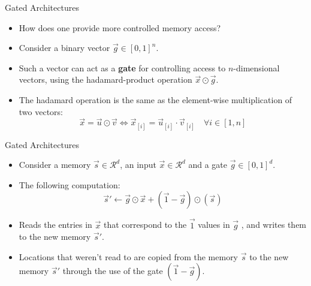 \documentclass[handout]{beamer}
\begin{document}
\begin{frame}{Gated Architectures}
\begin{scriptsize}
\begin{itemize}
\item How does one provide more controlled memory access?
\item Consider a binary vector $\vec{g} \in [0,1]^n$. 
\item Such a vector can act as a \textbf{gate} for controlling access to $n$-dimensional vectors, using the hadamard-product operation $\vec{x} \odot \vec{g}$.
\item The hadamard operation is the same as the element-wise multiplication of two vectors:
\begin{displaymath}
\vec{x} = \vec{u} \odot \vec{v}  \Leftrightarrow  \vec{x}_{[i]} = \vec{u}_{[i]} \cdot \vec{v}_{[i]} \quad \forall i \in [1,n]
\end{displaymath}
\end{itemize}
\end{scriptsize}
\end{frame}




\begin{frame}{Gated Architectures}
\begin{scriptsize}
\begin{itemize}
\item Consider a memory $\vec{s} \in \mathcal{R}^{d}$, an input $\vec{x} \in \mathcal{R}^{d}$ and a gate $\vec{g} \in [0,1]^{d}$.
\item The following computation:
\begin{displaymath}
\vec{s}' \leftarrow \vec{g} \odot \vec{x} + (\vec{1}-\vec{g}) \odot (\vec{s}) 
\end{displaymath}
\item Reads the entries in $\vec{x}$ that correspond to the $\vec{1}$ values in $\vec{g}$ , and writes them to the new memory $\vec{s}'$.
\item Locations that weren't read to are copied from the memory $\vec{s}$ to the new memory $\vec{s}'$ through the use of the gate $(\vec{1}-\vec{g})$.
\end{itemize}
\end{scriptsize}
\end{frame}
\end{document}
